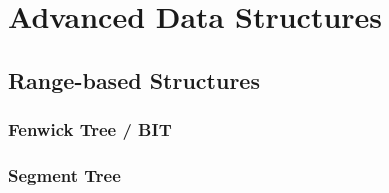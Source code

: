 \section{Advanced Data Structures}
\subsection{Range-based Structures}
\subsubsection{Fenwick Tree / BIT}
\subsubsection{Segment Tree}